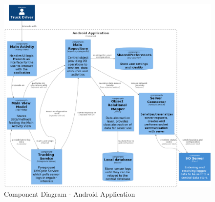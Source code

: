 \begin{figure}
\centering
\includegraphics[width=6in]{../diag/android_component.png}
\caption{Component Diagram - Android Application}
\label{fig:android_component}
\end{figure}

